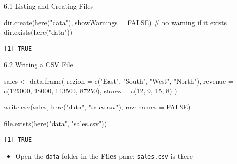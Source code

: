 \documentclass[
  ignorenonframetext,
  aspectratio=169,
]{beamer}
\newenvironment{Shaded}{\begin{snugshade}}{\end{snugshade}}
\newcommand{\AttributeTok}[1]{\textcolor[rgb]{0.40,0.45,0.13}{#1}}
\newcommand{\CommentTok}[1]{\textcolor[rgb]{0.37,0.37,0.37}{#1}}
\newcommand{\ConstantTok}[1]{\textcolor[rgb]{0.56,0.35,0.01}{#1}}
\newcommand{\DecValTok}[1]{\textcolor[rgb]{0.68,0.00,0.00}{#1}}
\newcommand{\FunctionTok}[1]{\textcolor[rgb]{0.28,0.35,0.67}{#1}}
\newcommand{\NormalTok}[1]{\textcolor[rgb]{0.00,0.23,0.31}{#1}}
\newcommand{\OtherTok}[1]{\textcolor[rgb]{0.00,0.23,0.31}{#1}}
\newcommand{\StringTok}[1]{\textcolor[rgb]{0.13,0.47,0.30}{#1}}
\providecommand{\tightlist}{%
  \setlength{\itemsep}{0pt}\setlength{\parskip}{0pt}}
\begin{document}
\begin{frame}[fragile]{6.1 Listing and Creating Files}
\endgroup

\begin{Shaded}
\begin{Highlighting}[]
\FunctionTok{dir.create}\NormalTok{(}\FunctionTok{here}\NormalTok{(}\StringTok{"data"}\NormalTok{), }\AttributeTok{showWarnings =} \ConstantTok{FALSE}\NormalTok{)   }\CommentTok{\# no warning if it exists}
\FunctionTok{dir.exists}\NormalTok{(}\FunctionTok{here}\NormalTok{(}\StringTok{"data"}\NormalTok{))}
\end{Highlighting}
\end{Shaded}

\begingroup\tiny\color{darkgray}

\begin{verbatim}
[1] TRUE
\end{verbatim}

\endgroup
\end{frame}

\begin{frame}[fragile]{6.2 Writing a CSV File}
\protect{}\label{writing-a-csv-file}
\begin{Shaded}
\begin{Highlighting}[]
\NormalTok{sales }\OtherTok{\textless{}{-}} \FunctionTok{data.frame}\NormalTok{(}
  \AttributeTok{region  =} \FunctionTok{c}\NormalTok{(}\StringTok{"East"}\NormalTok{, }\StringTok{"South"}\NormalTok{, }\StringTok{"West"}\NormalTok{, }\StringTok{"North"}\NormalTok{),}
  \AttributeTok{revenue =} \FunctionTok{c}\NormalTok{(}\DecValTok{125000}\NormalTok{, }\DecValTok{98000}\NormalTok{, }\DecValTok{143500}\NormalTok{, }\DecValTok{87250}\NormalTok{),}
  \AttributeTok{stores  =} \FunctionTok{c}\NormalTok{(}\DecValTok{12}\NormalTok{, }\DecValTok{9}\NormalTok{, }\DecValTok{15}\NormalTok{, }\DecValTok{8}\NormalTok{)}
\NormalTok{)}

\FunctionTok{write.csv}\NormalTok{(sales, }\FunctionTok{here}\NormalTok{(}\StringTok{"data"}\NormalTok{, }\StringTok{"sales.csv"}\NormalTok{), }\AttributeTok{row.names =} \ConstantTok{FALSE}\NormalTok{)}

\FunctionTok{file.exists}\NormalTok{(}\FunctionTok{here}\NormalTok{(}\StringTok{"data"}\NormalTok{, }\StringTok{"sales.csv"}\NormalTok{))}
\end{Highlighting}
\end{Shaded}

\begingroup\tiny\color{darkgray}

\begin{verbatim}
[1] TRUE
\end{verbatim}

\endgroup

\begin{itemize}
\tightlist
\item
  Open the \texttt{data} folder in the \textbf{Files} pane:
  \texttt{sales.csv} is there
\end{itemize}
\end{frame}
\end{document}
